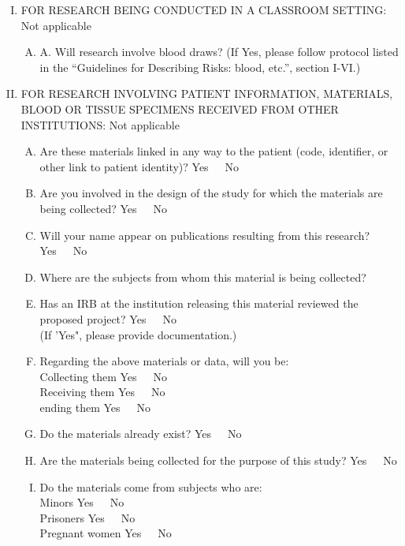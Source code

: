 \documentclass{article}
\newcommand{\na}{{\color{blue}Not applicable} }
\newcommand{\yn}{{Yes~~~No\\ }}
\begin{document}
\begin{enumerate}[I.]
    \item FOR RESEARCH BEING CONDUCTED IN A CLASSROOM SETTING: \na

        \begin{enumerate}[A.]
            \item A. Will research involve blood draws?  (If Yes, please follow
                protocol listed in the “Guidelines for Describing Risks: blood,
                etc.”, section I-VI.)
        \end{enumerate}

    \item FOR RESEARCH INVOLVING PATIENT INFORMATION, MATERIALS, BLOOD OR TISSUE
            SPECIMENS RECEIVED FROM OTHER INSTITUTIONS: \na

            \begin{enumerate}[A.]
                \item Are these materials linked in any way to the patient
                    (code, identifier, or other link to
                            patient identity)? \yn
                \item Are you involved in the design of the study for which the
                    materials are being collected? \yn
                \item Will your name appear on publications resulting from this
                    research? \yn
                \item Where are the subjects from whom this material is being
                    collected?
                \item Has an IRB at the institution releasing this material
                    reviewed the proposed project? \yn
                                (If 'Yes", please provide documentation.)
                \item Regarding the above materials or data, will you be:\\
                    Collecting them \yn
                    Receiving them \yn
                    ending them \yn

                \item Do the materials already exist? \yn

                \item Are the materials being collected for the purpose of this
                    study? \yn

                \item Do the materials come from subjects who are: \\
                    Minors \yn
                    Prisoners \yn
                    Pregnant women \yn


\end{enumerate}
\end{enumerate}
\end{document}
